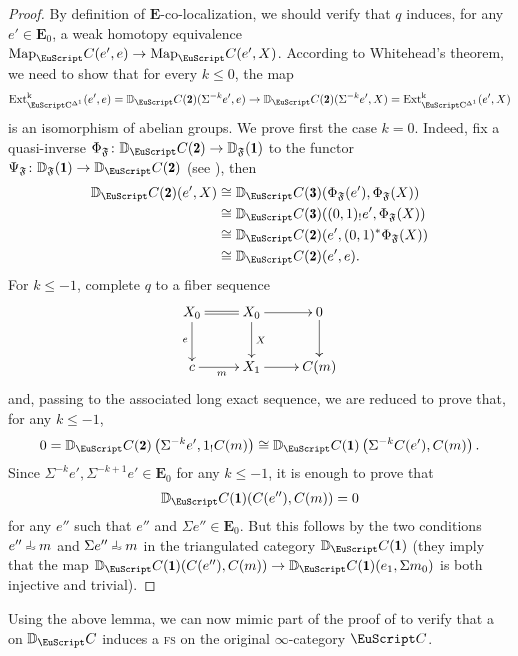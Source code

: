 \begin{proof}
By definition of $\mathbf E$-co-localization, we should verify that $q$ induces, for any $e'\in \mathbf E_0$, a weak homotopy equivalence
$\mathrm{Map}_\iC(e',e) \to \mathrm{Map}_\iC(e',X)$. According to Whitehead's theorem, we need to show that for every $k\leq 0$, the map
\[
\mathrm{Ext_{\iC^{\Delta^1}}^k}(e',e)=\D_\iC(\due)(\Sigma^{-k}e',e)\to \D_\iC(\due)(\Sigma^{-k}e',X)= \mathrm{Ext_{\iC^{\Delta^1}}^k}(e',X)
\] 
is an isomorphism of abelian groups. We prove first the case $k=0$. Indeed, fix a quasi-inverse $\Phi_\F\colon \D_\iC(\due)\to \D_\F(\uno)$ to the functor $\Psi_\F\colon \D_\F(\uno)\to \D_\iC(\due)$ (see \athm{}), then 
\begin{align*}
\D_\iC(\due)(e',X)&\cong \D_\iC(\tre)(\Phi_\F(e'),\Phi_\F(X))\\
&\cong \D_\iC(\tre)((0,1)_!e',\Phi_\F(X))\\
&\cong \D_\iC(\due)(e',(0,1)^*\Phi_\F(X))\\
&\cong \D_\iC(\due)(e',e).
\end{align*}
For $k\leq -1$, complete $q$ to a fiber sequence
\[
\begin{matrix}\xymatrix{
X_0\ar@{=}[r]\ar[d]_e&X_0\ar[d]^X\ar[r]&0\ar[d]\\
c\ar[r]_{m}&X_1\ar[r]&C(m)
}\end{matrix}
\]
and, passing to the associated long exact sequence, we are reduced to prove that, for any $k\leq -1$,
\[
0=\D_\iC(\due)\left(\Sigma^{-k}e',1_!C(m)\right)\cong \D_\iC(\uno)\left(\Sigma^{-k}C(e'),C(m)\right).
\]
Since $\Sigma^{-k}e', \Sigma^{-k+1}e'\in \mathbf E_0$ for any $k\leq -1$,  it is enough to prove that 
\[
\D_\iC(\uno)(C(e''),C(m))=0
\]
for any $e''$ such that $e''$ and $\Sigma e''\in \mathbf E_0$. But this follows by the two conditions $e''\horth m$ and $\Sigma e''\horth m$ in the triangulated category $\D_\iC(\uno)$ (they imply that the map $\D_\iC(\uno)(C(e''),C(m))\to \D_\iC(\uno)(e_1,\Sigma m_0)$ is both injective and trivial).
\end{proof}

Using the above lemma, we can now mimic part of the proof of \cite[\aprop \textbf{5.2.8.17}]{HTT} to verify that a \dfs on $\D_\iC$ induces a \textsc{fs} on the original $\infty$-category $\iC$. 

